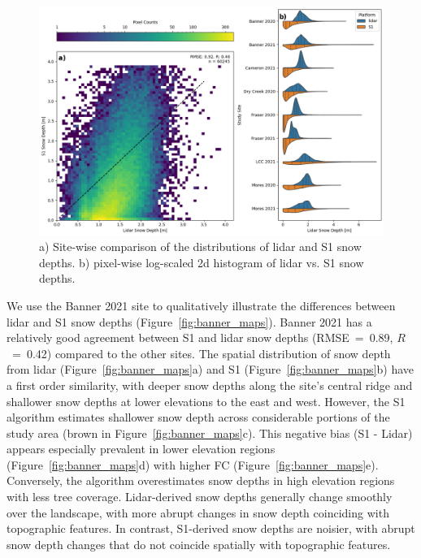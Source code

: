 \documentclass[journal abbreviation, manuscript]{copernicus}
\begin{document}
\begin{figure}[htbp]
    \centering
    \includegraphics[width=\textwidth]{figures/violins_summary.png}
    \caption{a) Site-wise comparison of the distributions of lidar and S1 snow depths. b) pixel-wise log-scaled 2d histogram of lidar vs. S1 snow depths.}
    \label{fig:violins_summary}
\end{figure}

We use the Banner 2021 site to qualitatively illustrate the differences between lidar and S1 snow depths (Figure~\ref{fig:banner_maps}). Banner 2021 has a relatively good agreement between S1 and lidar snow depths (RMSE~=~0.89, $R$~=~0.42) compared to the other sites. The spatial distribution of snow depth from lidar (Figure~\ref{fig:banner_maps}a) and S1 (Figure~\ref{fig:banner_maps}b) have a first order similarity, with deeper snow depths along the site's central ridge and shallower snow depths at lower elevations to the east and west. However, the S1 algorithm estimates shallower snow depth across considerable portions of the study area (brown in Figure~\ref{fig:banner_maps}c). This negative bias (S1 - Lidar) appears especially prevalent in lower elevation regions (Figure~\ref{fig:banner_maps}d) with higher FC (Figure~\ref{fig:banner_maps}e). Conversely, the algorithm overestimates snow depths in high elevation regions with less tree coverage. Lidar-derived snow depths generally change smoothly over the landscape, with more abrupt changes in snow depth coinciding with topographic features. In contrast, S1-derived snow depths are noisier, with abrupt snow depth changes that do not coincide spatially with topographic features. 
\end{document}
